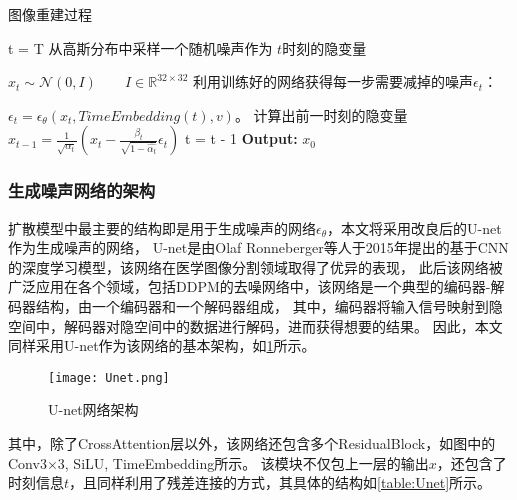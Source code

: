 \begin{algorithm}[H]
    
    \caption{图像重建过程}
    \begin{algorithmic}[1]
        \State t = T
        \State 从高斯分布中采样一个随机噪声作为 $t$时刻的隐变量
        
        $x_t \sim \mathcal{N}(0, I) \qquad I \in \mathbb{R}^{32 \times 32}$
        \State 利用训练好的网络获得每一步需要减掉的噪声$\epsilon_t$：
        
        $\epsilon_t = \epsilon_\theta(x_t, TimeEmbedding(t), v)$。
        \State 计算出前一时刻的隐变量$x_{t-1} = \frac{1}{\sqrt{\alpha_t}}(x_t - \frac{\beta_t}{\sqrt{1-\hat{\alpha_t}}}\epsilon_t)$
        \State t = t - 1
        \EndWhile
        \State \textbf{Output:} $x_0$
    \end{algorithmic}
    \label{algorithm:ForwardDiffusion}
\end{algorithm}

\subsubsection{生成噪声网络的架构}

扩散模型中最主要的结构即是用于生成噪声的网络$\epsilon_\theta$，本文将采用改良后的U-net作为生成噪声的网络，
U-net是由Olaf Ronneberger等人于2015年提出的基于CNN的深度学习模型\cite{2015U}，该网络在医学图像分割领域取得了优异的表现，
此后该网络被广泛应用在各个领域，包括DDPM的去噪网络中\cite{DDPM}，该网络是一个典型的编码器-解码器结构，由一个编码器和一个解码器组成，
其中，编码器将输入信号映射到隐空间中，解码器对隐空间中的数据进行解码，进而获得想要的结果。
因此，本文同样采用U-net作为该网络的基本架构，如\cref{figure:Unet}所示。

\begin{figure}
    \centering
    \texttt{[image: Unet.png]}
    \caption{U-net网络架构}
    \label{figure:Unet}
\end{figure}

其中，除了CrossAttention层以外，该网络还包含多个ResidualBlock，如图中的Conv3$\times$3, SiLU, TimeEmbedding所示。
该模块不仅包上一层的输出$x$，还包含了时刻信息$t$，且同样利用了残差连接的方式，其具体的结构如\cref{table:Unet}所示。

